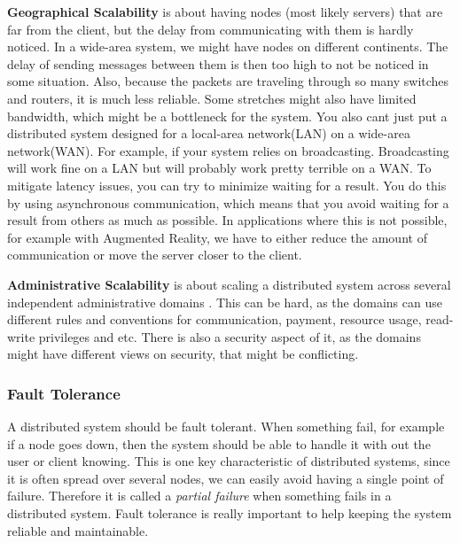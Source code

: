 \textbf{Geographical Scalability} is about having nodes (most likely servers) that are far from the client, but the delay from communicating with them is hardly noticed. In a wide-area system, we might have nodes on different continents. The delay of sending messages between them is then too high to not be noticed in some situation. Also, because the packets are traveling through so many switches and routers, it is much less reliable. Some stretches might also have limited bandwidth, which might be a bottleneck for the system. You also cant just put a distributed system designed for a local-area network(LAN) on a wide-area network(WAN). For example, if your system relies on broadcasting. Broadcasting will work fine on a LAN but will probably work pretty terrible on a WAN. To mitigate latency issues, you can try to minimize waiting for a result. You do this by using asynchronous communication, which means that you avoid waiting for a result from others as much as possible. In applications where this is not possible, for example with Augmented Reality, we have to either reduce the amount of communication or move the server closer to the client.

\textbf{Administrative Scalability} is about scaling a distributed system across several independent administrative domains \cite{steen_distributed_2017}. This can be hard, as the domains can use different rules and conventions for communication, payment, resource usage, read-write privileges and etc. There is also a security aspect of it, as the domains might have different views on security, that might be conflicting. 



\subsubsection{Fault Tolerance}
A distributed system should be fault tolerant. When something fail, for example if a node goes down, then the system should be able to handle it with out the user or client knowing. This is one key characteristic of distributed systems, since it is often spread over several nodes, we can easily avoid having a single point of failure. Therefore it is called a \textit{partial failure}\cite{steen_distributed_2017} when something fails in a distributed system. 
Fault tolerance is really important to help keeping the system reliable and maintainable. 

